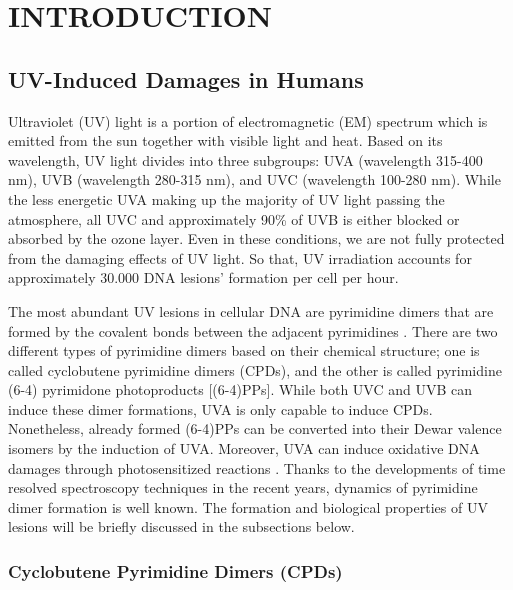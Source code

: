 \setlength{\parindent}{0pt}
\chapter{\bf INTRODUCTION}

\section{UV-Induced Damages in Humans}

Ultraviolet (UV) light is a portion of electromagnetic (EM) spectrum which is emitted from the sun together with visible light and heat. Based on its wavelength, UV light divides into three subgroups: UVA (wavelength 315-400 nm), UVB (wavelength 280-315 nm), and UVC (wavelength 100-280 nm). While the less energetic UVA making up the majority of UV light passing the atmosphere, all UVC and approximately 90\% of UVB is either blocked or absorbed by the ozone layer. Even in these conditions, we are not fully protected from the damaging effects of UV light. So that, UV irradiation accounts for approximately 30.000 DNA lesions’ formation per cell per hour.

The most abundant UV lesions in cellular DNA are pyrimidine dimers \citep{kielbassa1997wavelength} that are formed by the covalent bonds between the adjacent pyrimidines \citep{whitmore2001effect}. There are two different types of pyrimidine dimers based on their chemical structure; one is called cyclobutene pyrimidine dimers (CPDs), and the other is called pyrimidine (6-4) pyrimidone photoproducts [(6-4)PPs]. While both UVC and UVB can induce these dimer formations, UVA is only capable to induce CPDs. Nonetheless, already formed (6-4)PPs can be converted into their Dewar valence isomers by the induction of UVA. Moreover, UVA can induce oxidative DNA damages through photosensitized reactions \citep{hu2017cartography}. Thanks to the developments of time resolved spectroscopy techniques in the recent years, dynamics of pyrimidine dimer formation is well known. The formation and biological properties of UV lesions will be briefly discussed in the subsections below.   

\subsection{Cyclobutene Pyrimidine Dimers (CPDs)} 

